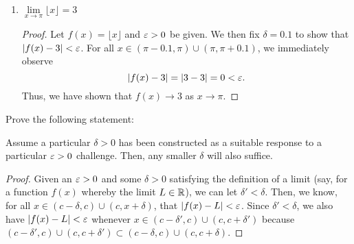\begin{problem}
\begin{enumerate}[label=(\alph*)]
\begin{proof}
\begin{itemize}
              The last inequality holds because $x^{2} + 2x + 4 \le 19$ for all
              $x$ such that $\abs{x - 2} < \delta \leq 1$,

            \item When $\eps > 19$, then $\delta = 1$. Then, for all $x$
              such that $\abs{x - 2} < 1$, it follows that
              \begin{align*}
                \abs{f(x) - 8} &= \\
                \abs{(x-2)(x^{2} +2x + 4)} &= \\
                \abs{x-2} \abs{x^{2} + 2x + 4} &< \abs{x^{2} + 2x + 4} \\ 
                                               &\leq 19 \\ 
                                               &< \eps
              \end{align*}
              because for all $x \in (1, 2) \cup (2, 3)$, the expression $x^{2} + 2x + 4$ is bounded above by $19$.

        \end{itemize}
        Thus, we have shown that $f(x) \to 8$ as $x \to 2$. 
      \end{proof}

    \item $\lim\limits_{x \to \pi} \lfloor x \rfloor = 3$ 
      \begin{proof}
        Let $f(x) = \lfloor x \rfloor$ and $\varepsilon > 0$ be given. We then fix $\delta = 0.1$ to show
        that $\left\lvert f(x) - 3 \right\rvert < \varepsilon$. For all $x \in (\pi - 0.1, \pi) \cup (\pi, \pi + 0.1)$, we immediately observe
        \[
          \left\lvert f(x) - 3 \right\rvert = \left\lvert 3 - 3 \right\rvert = 0 < \varepsilon.
        \]
        Thus, we have shown that $f(x) \to 3$ as $x \to \pi$.
      \end{proof}

  \end{enumerate}
\end{problem}


\begin{problem}
  Prove the following statement:
    \begin{displayquote}
      Assume a particular $\delta > 0$ has been constructed as a suitable response to
      a particular $\varepsilon > 0$ challenge. Then, any smaller $\delta$ will also suffice.
    \end{displayquote}

  \begin{proof}
    Given an $\varepsilon > 0$ and some $\delta > 0$ satisfying the definition of a
    limit (say, for a function $f(x)$ whereby the limit $L \in \mathbb{R}$), we can let
    $\delta' < \delta$. Then, we know, for all $x \in (c - \delta, c) \cup (c, x + \delta)$, that
    $\left\lvert f(x) - L \right\rvert < \varepsilon$. Since $\delta' < \delta$, we also have $\left\lvert f(x) - L \right\rvert < \varepsilon$ whenever
    $x \in (c - \delta', c) \cup (c, c + \delta')$ because 
    $(c - \delta', c) \cup (c, c + \delta') \subset (c - \delta, c) \cup (c, c + \delta)$.
  \end{proof}
\end{problem}


